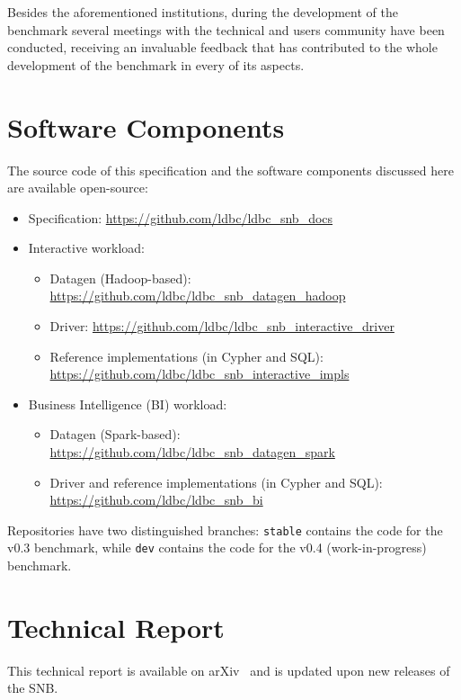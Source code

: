 \begin{figure}
\end{figure}

Besides the aforementioned institutions, during the development of the
benchmark several meetings with the technical and users community have been
conducted, receiving an invaluable feedback that has contributed to the whole
development of the benchmark in every of its aspects.


\section{Software Components}

The source code of this specification and the software components discussed here are available open-source:

\begin{itemize}
    \item Specification: \url{https://github.com/ldbc/ldbc_snb_docs}
    \item Interactive workload:
        \begin{itemize}
            \item Datagen (Hadoop-based): \url{https://github.com/ldbc/ldbc_snb_datagen_hadoop}
            \item Driver: \url{https://github.com/ldbc/ldbc_snb_interactive_driver}
            \item Reference implementations (in Cypher and SQL): \url{https://github.com/ldbc/ldbc_snb_interactive_impls}
        \end{itemize}
    \item Business Intelligence (BI) workload:
        \begin{itemize}
            \item Datagen (Spark-based): \url{https://github.com/ldbc/ldbc_snb_datagen_spark}
            \item Driver and reference implementations (in Cypher and SQL): \url{https://github.com/ldbc/ldbc_snb_bi}
        \end{itemize}
\end{itemize}

Repositories have two distinguished branches:
\texttt{stable} contains the code for the v0.3 benchmark, while
\texttt{dev} contains the code for the v0.4 (work-in-progress) benchmark.


\section{Technical Report}

This technical report is available on arXiv~\cite{DBLP:journals/corr/abs-2001-02299} and is updated upon new releases of the SNB.
